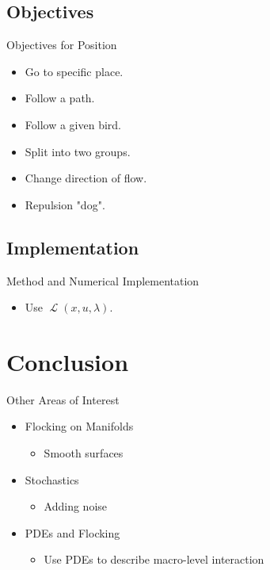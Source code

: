 \documentclass{beamer}
\DeclareMathOperator{\Lagr}{\mathcal{L}}			%
\begin{document}
\subsection{Objectives}
\begin{frame}{Objectives for Position}
	\begin{itemize} 
		\item Go to specific place.
		\item Follow a path.
		\item Follow a given bird.
		\item Split into two groups.
		\item Change direction of flow.
		\item Repulsion "dog".
	\end{itemize}
\end{frame}
\subsection{Implementation}
\begin{frame}{Method and Numerical Implementation}
	\begin{itemize}
		\item Use $\Lagr(x,u,\lambda)$.
	\end{itemize}
\end{frame}
\section{Conclusion}
\begin{frame}{Other Areas of Interest}
	\begin{itemize}
		\item Flocking on Manifolds
			\begin{itemize}
				\item Smooth surfaces
			\end{itemize}
		\item Stochastics
			\begin{itemize}
				\item Adding noise
			\end{itemize}
		\item PDEs and Flocking 
			\begin{itemize}
				\item Use PDEs to describe macro-level interaction
			\end{itemize}
	\end{itemize}
\end{frame}
\end{document}
